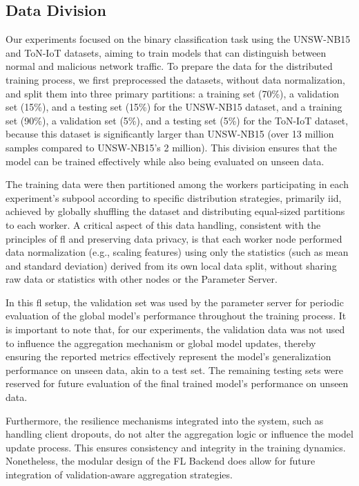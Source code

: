 \subsection{Data Division}
\label{sec:data-division}

Our experiments focused on the binary classification task using the UNSW-NB15 and ToN-IoT datasets, aiming to train models that can distinguish between normal and malicious network traffic. To prepare the data for the distributed training process, we first preprocessed the datasets, without data normalization, and split them into three primary partitions: a training set (70\%), a validation set (15\%), and a testing set (15\%) for the UNSW-NB15 dataset, and a training set (90\%), a validation set (5\%), and a testing set (5\%) for the ToN-IoT dataset, because this dataset is significantly larger than UNSW-NB15 (over 13 million samples compared to UNSW-NB15's 2 million). This division ensures that the model can be trained effectively while also being evaluated on unseen data.

The training data were then partitioned among the workers participating in each experiment's subpool according to specific distribution strategies, primarily \ac{iid}, achieved by globally shuffling the dataset and distributing equal-sized partitions to each worker. A critical aspect of this data handling, consistent with the principles of \ac{fl} and preserving data privacy, is that each worker node performed data normalization (e.g., scaling features) using only the statistics (such as mean and standard deviation) derived from its own local data split, without sharing raw data or statistics with other nodes or the Parameter Server.

In this \ac{fl} setup, the validation set was used by the parameter server for periodic evaluation of the global model's performance throughout the training process. It is important to note that, for our experiments, the validation data was not used to influence the aggregation mechanism or global model updates, thereby ensuring the reported metrics effectively represent the model's generalization performance on unseen data, akin to a test set. The remaining testing sets were reserved for future evaluation of the final trained model's performance on unseen data.

Furthermore, the resilience mechanisms integrated into the system, such as handling client dropouts, do not alter the aggregation logic or influence the model update process. This ensures consistency and integrity in the training dynamics. Nonetheless, the modular design of the FL Backend does allow for future integration of validation-aware aggregation strategies. 




